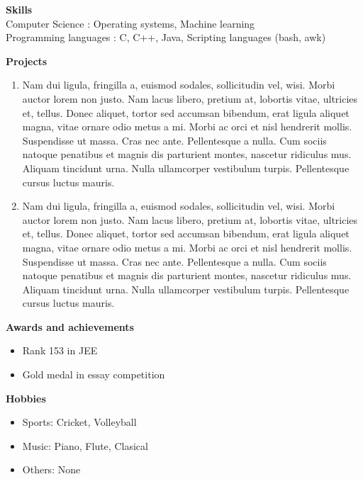 \documentclass[11pt]{article}
\begin{document}
\vspace{10pt}
\par \textbf{Skills}\vspace{10pt}\\
Computer Science            :  Operating systems, Machine learning\\
Programming languages       :  C, C++, Java, Scripting languages (bash, awk)\\
\par \textbf{Projects}
\begin{enumerate}
    \item Nam dui ligula, fringilla a, euismod sodales, sollicitudin vel, wisi. Morbi auctor lorem non justo. Nam lacus
libero, pretium at, lobortis vitae, ultricies et, tellus. Donec aliquet, tortor sed accumsan bibendum, erat ligula
aliquet magna, vitae ornare odio metus a mi. Morbi ac orci et nisl hendrerit mollis. Suspendisse ut massa.
Cras nec ante. Pellentesque a nulla. Cum sociis natoque penatibus et magnis dis parturient montes, nascetur
ridiculus mus. Aliquam tincidunt urna. Nulla ullamcorper vestibulum turpis. Pellentesque cursus luctus
mauris.
    \item Nam dui ligula, fringilla a, euismod sodales, sollicitudin vel, wisi. Morbi auctor lorem non justo. Nam lacus
libero, pretium at, lobortis vitae, ultricies et, tellus. Donec aliquet, tortor sed accumsan bibendum, erat ligula
aliquet magna, vitae ornare odio metus a mi. Morbi ac orci et nisl hendrerit mollis. Suspendisse ut massa.
Cras nec ante. Pellentesque a nulla. Cum sociis natoque penatibus et magnis dis parturient montes, nascetur
ridiculus mus. Aliquam tincidunt urna. Nulla ullamcorper vestibulum turpis. Pellentesque cursus luctus
mauris.
\end{enumerate}
\renewcommand{\labelitemi}{$\textendash$}
\par \textbf{Awards and achievements}\vspace{5pt}
    \begin{itemize}
        \item Rank 153 in JEE
        \item Gold medal in essay competition
    \end{itemize}
\par \textbf{Hobbies}\vspace{5pt}
    \begin{itemize}
        \item Sports: Cricket, Volleyball
        \item Music: Piano, Flute, Clasical
        \item Others: None
    \end{itemize}
\end{document}
